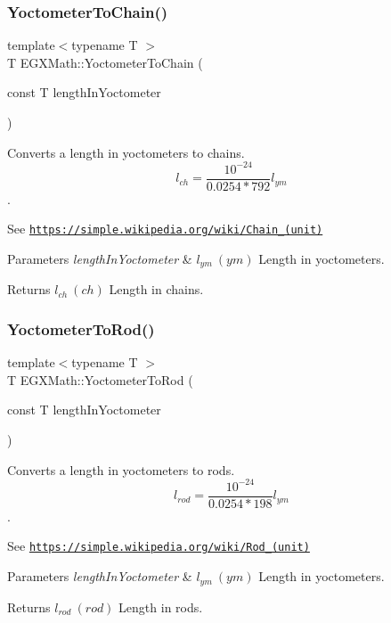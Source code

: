 \subsubsection{\texorpdfstring{Yoctometer\+To\+Chain()}{YoctometerToChain()}}
{\footnotesize\ttfamily template$<$typename T $>$ \\
T E\+G\+X\+Math\+::\+Yoctometer\+To\+Chain (\begin{DoxyParamCaption}\item[{const T}]{length\+In\+Yoctometer }\end{DoxyParamCaption})}



Converts a length in yoctometers to chains. \[ l_{ch}= \frac{10^{-24}}{0.0254 * 792} l_{ym} \]. 

See \href{https://simple.wikipedia.org/wiki/Chain_(unit)}{\tt https\+://simple.\+wikipedia.\+org/wiki/\+Chain\+\_\+(unit)} 
\begin{DoxyParams}{Parameters}
{\em length\+In\+Yoctometer} & $ l_{ym}\ (ym)$ Length in yoctometers. \\
\hline
\end{DoxyParams}
\begin{DoxyReturn}{Returns}
$ l_{ch}\ (ch)$ Length in chains. 
\end{DoxyReturn}
\mbox{\label{group___e_g_x_math-_conversions-_length_conversions-_s_i-_yoctometer-_surveyors_gaabe3a5aaa7081b0489d25f0b2117c11b}} 
\subsubsection{\texorpdfstring{Yoctometer\+To\+Rod()}{YoctometerToRod()}}
{\footnotesize\ttfamily template$<$typename T $>$ \\
T E\+G\+X\+Math\+::\+Yoctometer\+To\+Rod (\begin{DoxyParamCaption}\item[{const T}]{length\+In\+Yoctometer }\end{DoxyParamCaption})}



Converts a length in yoctometers to rods. \[ l_{rod}= \frac{10^{-24}}{0.0254 * 198} l_{ym} \]. 

See \href{https://simple.wikipedia.org/wiki/Rod_(unit)}{\tt https\+://simple.\+wikipedia.\+org/wiki/\+Rod\+\_\+(unit)} 
\begin{DoxyParams}{Parameters}
{\em length\+In\+Yoctometer} & $ l_{ym}\ (ym)$ Length in yoctometers. \\
\hline
\end{DoxyParams}
\begin{DoxyReturn}{Returns}
$ l_{rod}\ (rod)$ Length in rods. 
\end{DoxyReturn}
